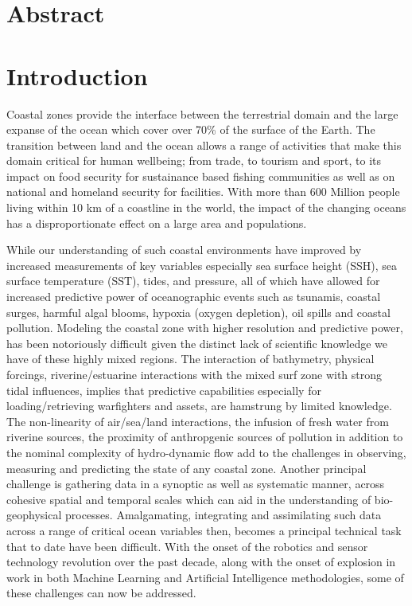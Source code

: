 \section*{Abstract}


\section{Introduction}
\label{sec:intro}

Coastal zones provide the interface between the terrestrial domain and
the large expanse of the ocean which cover over 70\% of the surface of
the Earth. The transition between land and the ocean allows a range of
activities that make this domain critical for human wellbeing; from
trade, to tourism and sport, to its impact on food security for
sustainance based fishing communities as well as on national and
homeland security for facilities. With more than 600 Million people
living within 10 km of a coastline in the world, the impact of the
changing oceans has a disproportionate effect on a large area and
populations. 

While our understanding of such coastal environments have improved by
increased measurements of key variables especially sea surface height
(SSH), sea surface temperature (SST), tides, and pressure, all of
which have allowed for increased predictive power of oceanographic
events such as tsunamis, coastal surges, harmful algal blooms, hypoxia
(oxygen depletion), oil spills and coastal pollution. Modeling the
coastal zone with higher resolution and predictive power, has been
notoriously difficult given the distinct lack of scientific knowledge
we have of these highly mixed regions. The interaction of bathymetry,
physical forcings, riverine/estuarine interactions with the mixed surf
zone with strong tidal influences, implies that predictive
capabilities especially for loading/retrieving warfighters and assets,
are hamstrung by limited knowledge. The non-linearity of air/sea/land
interactions, the infusion of fresh water from riverine sources, the
proximity of anthropgenic sources of pollution in addition to the
nominal complexity of hydro-dynamic flow add to the challenges in
observing, measuring and predicting the state of any coastal
zone. Another principal challenge is gathering data in a synoptic as
well as systematic manner, across cohesive spatial and temporal scales
which can aid in the understanding of bio-geophysical
processes. Amalgamating, integrating and assimilating such data across
a range of critical ocean variables then, becomes a principal
technical task that to date have been difficult. With the onset of the
robotics and sensor technology revolution over the past decade, along
with the onset of explosion in work in both Machine Learning and
Artificial Intelligence methodologies, some of these challenges can
now be addressed.

